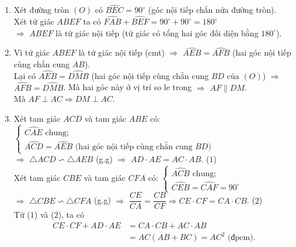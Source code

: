 \begin{ex}
{\begin{enumerate}
\item Xét đường tròn $(O)$ có $\widehat{BEC} = 90^\circ$ (góc nội tiếp chắn nửa đường tròn).\\
Xét tứ giác $ABEF$ ta có $\widehat{FAB} + \widehat{BEF} = 90^\circ + 90^\circ = 180^\circ$\\
$\Rightarrow$ $ABEF$ là tứ giác nội tiếp (tứ giác có tổng hai góc đối diện bằng $180^\circ$).
\item Vì tứ giác $ABEF$ là tứ giác nội tiếp (cmt) $\Rightarrow$ $\widehat{AEB} = \widehat{AFB}$ (hai góc nội tiếp cùng chắn cung $AB$).\\
Lại có $\widehat{AEB} = \widehat{DMB}$ (hai góc nội tiếp cùng chắn cung $BD$ của $(O)$)
$\Rightarrow$ $\widehat{AFB} = \widehat{DMB}$. Mà hai góc này ở vị trí so le trong $\Rightarrow$ $AF \parallel DM$.\\
Mà $AF \perp AC \Rightarrow DM \perp AC$.
\item Xét tam giác $ACD$ và tam giác $ABE$ có:\\
$\begin{cases} \widehat{CAE} \text{ chung};\\
\widehat{ACD} = \widehat{AEB} \text{ (hai góc nội tiếp cùng chắn cung $BD$)}\end{cases}$\\
$\Rightarrow$ $\triangle ACD \backsim \triangle AEB$ (g.g) $\Rightarrow$ $AD \cdot AE = AC \cdot AB$. \hspace{\fill} ($1$)\\
Xét tam giác $CBE$ và tam giác $CFA$ có:
$\begin{cases}\widehat{ACB} \text{ chung};\\ \widehat{CEB} = \widehat{CAF} = 90^{\circ} \end{cases}$\\
$\Rightarrow$ $\triangle CBE \backsim \triangle CFA$ (g.g) $\Rightarrow$ $\dfrac{CE}{CA} = \dfrac{CB}{CF} \Rightarrow CE \cdot CF = CA \cdot CB$. \hspace{\fill} ($2$)\\
Từ ($1$) và ($2$), ta có \begin{align*}
 CE \cdot CF + AD \cdot AE & = CA \cdot CB + AC \cdot AB\\ &= AC(AB + BC) = AC^2 \text{    (đpcm).}
\end{align*}
\end{enumerate}
}
\end{ex}


